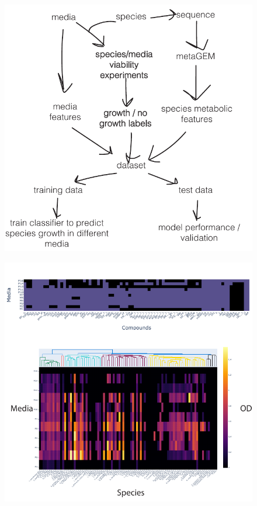 \documentclass[11pt,a4paper]{article}
\begin{document}
\begin{figure}[p]
    \includegraphics[width=\textwidth]{figures/FIG_pipeline.pdf}
    \caption{}
    \label{fig:FIG_pipeline}
 \end{figure}

\begin{figure}[p]
    \includegraphics[width=\textwidth]{figures/FIG_dataset.pdf}
    \caption{}
    \label{fig:FIG_dataset}
 \end{figure}
 
\end{document}
